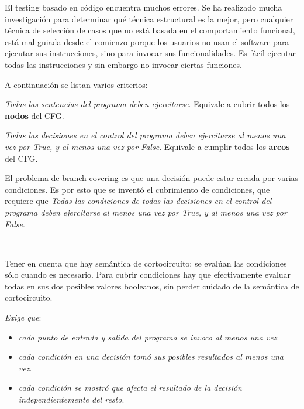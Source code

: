 \documentclass[]{article}
\begin{document}
El testing basado en código encuentra muchos errores. Se ha realizado mucha investigación para determinar qué técnica estructural es la mejor, pero cualquier técnica de selección de casos que no está basada en el comportamiento funcional, está mal guiada desde el comienzo porque los usuarios no usan el software para ejecutar sus instrucciones, sino para invocar sus funcionalidades. Es fácil ejecutar todas las instrucciones y sin embargo no invocar ciertas funciones.

A continuación se listan varios criterios:

\textit{Todas las sentencias del programa deben ejercitarse}. Equivale a cubrir todos los \textbf{nodos} del CFG.

\textit{Todas las decisiones en el control del programa deben ejercitarse al menos una vez por True, y al menos una vez por False}. Equivale a cumplir todos los \textbf{arcos} del CFG.

\begin{center}
\end{center}

El problema de branch covering es que una decisión puede estar creada por varias condiciones. Es por esto que se inventó el cubrimiento de condiciones, que requiere que \textit{Todas las condiciones de todas las decisiones en el control del programa deben ejercitarse al menos una vez por True, y al menos una vez por False}.

\begin{center}
	\\
\end{center}

Tener en cuenta que hay semántica de cortocircuito: se evalúan las condiciones sólo cuando es necesario. Para cubrir condiciones hay que efectivamente evaluar todas en sus dos posibles valores booleanos, sin perder cuidado de la semántica de cortocircuito.

\textit{Exige que}:
\begin{itemize}
	\item \textit{cada punto de entrada y salida del programa se invoco al menos una vez}.
	\item \textit{cada condición en una decisión tomó sus posibles resultados al menos una vez}.
	\item \textit{cada condición se mostró que afecta el resultado de la decisión independientemente del resto}.
\end{itemize}
\end{document}

